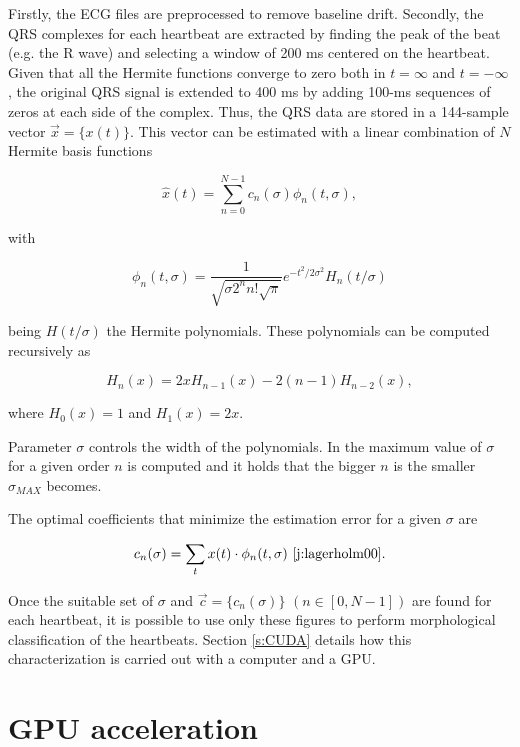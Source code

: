 \documentclass[runningheads]{llncs}
\begin{document}
Firstly,  the ECG files are preprocessed to remove baseline drift. Secondly, the QRS complexes for each heartbeat are extracted by finding the peak of the beat (e.g. the R wave) and selecting a  window of 200 ms centered on the heartbeat. Given that all the Hermite functions converge to zero both in $t=\infty$ and $t=-\infty$, the original QRS signal is extended to 400 ms by adding 100-ms sequences of zeros at each side of the complex. Thus, the QRS data are stored in a 144-sample vector $\vec{x}=\{x(t)\}$. This vector can be estimated with a linear combination of $N$ Hermite basis functions

\begin{equation}\label{eqn:hat}
\hat{x}(t)=\sum_{n=0}^{N-1}c_n(\sigma )\phi_n(t,\sigma),
\end{equation}

\noindent with

\begin{equation}\label{eqn:phi}
\phi_n(t,\sigma )=\frac{1}{\sqrt{\sigma 2^n n!\sqrt{\pi}}}e^{-t^2/2\sigma^2}H_n(t/\sigma) 
\end{equation}

\noindent being $H(t/\sigma)$ the Hermite polynomials. These polynomials can be computed recursively as

\begin{equation}
H_n(x)=2xH_{n-1}(x)-2(n-1)H_{n-2}(x),
\end{equation}

\noindent where $H_0(x)=1$ and $H_1(x)=2x$.

Parameter $\sigma$ controls the width of the polynomials. In \cite{j:lagerholm00} the maximum value of $\sigma$ for a given order $n$ is computed and it holds that the bigger $n$ is the smaller $\sigma_{MAX}$ becomes.

The optimal coefficients that minimize the estimation error for a given $\sigma$ are

\begin{equation}\label{eqn:c}
c_n(\sigma)=\sum_{t} x(t)\cdot \phi_n(t,\sigma) \textrm{~\cite{j:lagerholm00}.}
\end{equation}

Once the suitable set of $\sigma$ and $\vec{c}=\{c_n(\sigma)\}$  \mbox{$(n\in [0,N-1])$} are found for each heartbeat, it is possible to use only these figures to perform morphological classification of the heartbeats. Section \ref{s:CUDA} details how this characterization is carried out with a computer and a GPU.
 

\section{GPU acceleration}\label{s:GPU}
\end{document}
